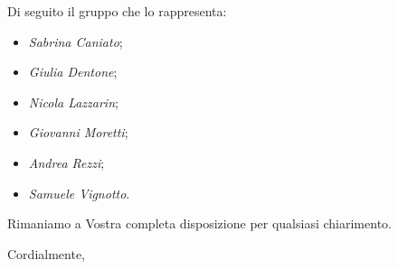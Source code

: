 \documentclass[12pt]{letter}
\begin{document}
\begin{letter}
Di seguito il gruppo che lo rappresenta:

\begin{itemize}
    \item \textit{Sabrina Caniato};
	\item \textit{Giulia Dentone};
	\item \textit{Nicola Lazzarin};
	\item \textit{Giovanni Moretti};
	\item \textit{Andrea Rezzi};
	\item \textit{Samuele Vignotto}.
\end{itemize}

Rimaniamo a Vostra completa disposizione per qualsiasi chiarimento.
\closing{Cordialmente,}
\end{letter}
\end{document}
